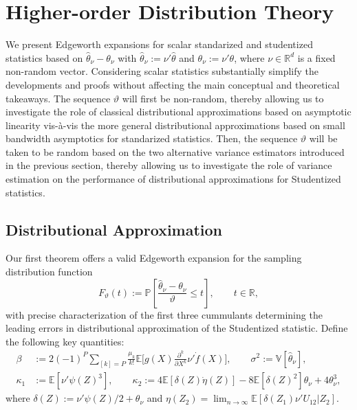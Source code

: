 \documentclass[11pt]{article}
\numberwithin{equation}{section}
\theoremstyle{definition}
\renewcommand{\P}{\mathbb{P}}
\newcommand{\E}{\mathbb{E}}
\newcommand{\V}{\mathbb{V}}
\newcommand{\R}{\mathbb{R}}
\newcommand{\Scale}{\vartheta}
\begin{document}
\section{Higher-order Distribution Theory}\label{sec: Higher-order Distribution Theory}

We present Edgeworth expansions for scalar standarized and studentized statistics based on $\widehat{\theta}_\nu - \theta_\nu$ with $\widehat{\theta}_\nu:=\nu'\widehat{\theta}$ and $\theta_\nu:=\nu'\theta$, where $\nu\in\R^d$ is a fixed non-random vector. Considering scalar statistics substantially simplify the developments and proofs without affecting the main conceptual and theoretical takeaways. The sequence $\Scale$ will first be non-random, thereby allowing us to investigate the role of classical distributional approximations based on asymptotic linearity vis-\`a-vis the more general distributional approximations based on small bandwidth asymptotics for standarized statistics. Then, the sequence $\Scale$ will be taken to be random based on the two alternative variance estimators introduced in the previous section, thereby allowing us to investigate the role of variance estimation on the performance of distributional approximations for Studentized statistics.

\subsection{Distributional Approximation}

Our first theorem offers a valid Edgeworth expansion for the sampling distribution function
\begin{equation*}
    F_\Scale(t) := \P\left[\frac{\widehat{\theta}_\nu - \theta_\nu}{\Scale} \leq t\right], \qquad t\in\R,
\end{equation*}
with precise characterization of the first three cummulants determining the leading errors in distributional approximation of the Studentized statistic. Define the following key quantities:
\begin{align*}
    \beta &:= 2(-1)^P\sum_{[k] = P}\frac{\mu_k}{k!}\E\Big[g(X) \frac{\partial^{k}}{\partial X^{k}}\nu'\dot{f}(X)\Big], \qquad \sigma^2 := \V[\widehat{\theta}_\nu],\\
    \kappa_1 &:= \E[\nu'\psi(Z)^3], \qquad
    \kappa_2 := 4\E[\delta(Z)\dot{\eta}(Z)] - 8 \E[\delta(Z)^2]\theta_\nu + 4\theta_\nu^3,
\end{align*}
where $\delta(Z) := \nu'\psi(Z)/2+\theta_\nu$ and $\eta(Z_2) = \lim_{n\to\infty} \E[\delta(Z_1)\nu'U_{12}|Z_2]$.
\end{document}
